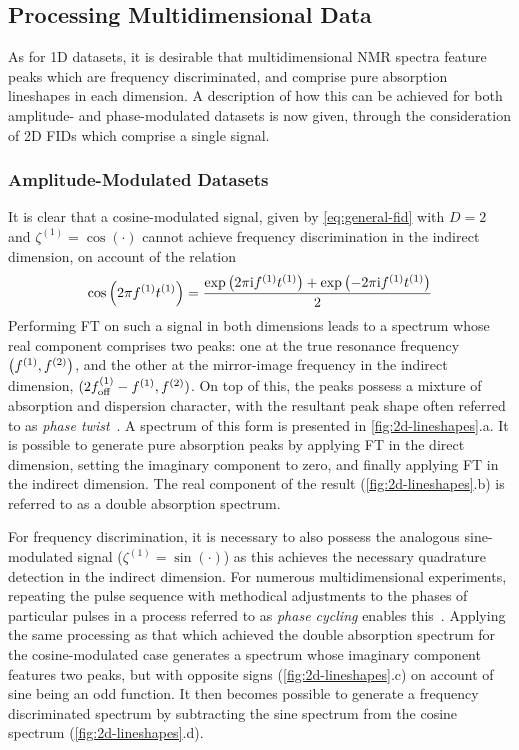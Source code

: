 \subsection{Processing Multidimensional Data}
\label{subsec:multidim}
As for \ac{1D} datasets, it is desirable that multidimensional \ac{NMR} spectra
feature peaks which are frequency discriminated, and comprise pure
absorption lineshapes in each dimension.
A description of how this can be achieved for both amplitude- and
phase-modulated datasets is now given, through the consideration of \ac{2D}
\acp{FID} which comprise a single signal.

\subsubsection{Amplitude-Modulated Datasets}
It is clear that a cosine-modulated signal, given by \cref{eq:general-fid}
with $D=2$ and $\zeta^{(1)} = \cos(\cdot)$ cannot achieve frequency
discrimination in the indirect dimension, on account of the relation
\begin{equation}
    \cos\left(2 \pi f^{(1)} t^{(1)}\right) =
    \frac{\exp\left(2 \pi \mathrm{i} f^{(1)} t^{(1)} \right) + \exp\left(-2 \pi \mathrm{i} f^{(1)} t^{(1)} \right)}{2}
\end{equation}
Performing \ac{FT} on such a signal in both dimensions leads to a spectrum
whose real component comprises two peaks: one at the true resonance frequency
$\left(f^{(1)}, f^{(2)}\right)$, and the other at the mirror-image frequency in the
indirect dimension, $(2f_{\mathrm{off}}^{(1)} - f^{(1)}, f^{(2)})$. On top of this, the
peaks possess a mixture of absorption and dispersion character, with the
resultant peak shape often referred to as \emph{phase twist}~\cite{Keeler1985}.
A spectrum of this form is presented in \cref{fig:2d-lineshapes}.a.
It is possible to generate pure absorption peaks by applying \ac{FT} in the
direct dimension, setting the imaginary component to zero, and finally
applying \ac{FT} in the indirect dimension. The real component of the result
(\cref{fig:2d-lineshapes}.b) is referred to as a double absorption spectrum.

For frequency discrimination, it is necessary to also possess the
analogous sine-modulated signal ($\zeta^{(1)} = \sin(\cdot)$) as this
achieves the necessary quadrature detection in the indirect dimension. For
numerous multidimensional experiments, repeating the
pulse sequence with methodical adjustments to the phases of particular pulses
in a process referred to as \emph{phase cycling} enables
this~\cite[Chapter 11]{Keeler2010}.
Applying the same processing as that which achieved the double absorption
spectrum for the cosine-modulated case generates a spectrum whose imaginary
component features two peaks, but with opposite signs
(\cref{fig:2d-lineshapes}.c) on account of sine being an odd function.
It then becomes possible to generate a frequency discriminated spectrum by
subtracting the sine spectrum from the cosine spectrum
(\cref{fig:2d-lineshapes}.d).

